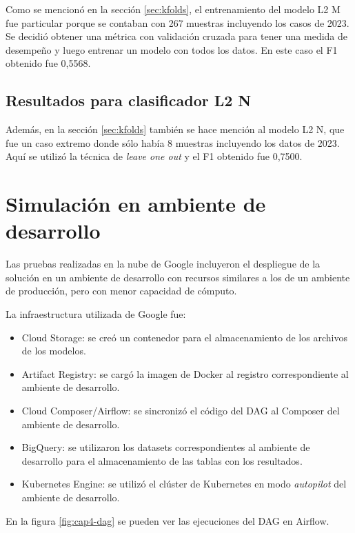 Como se mencionó en la sección \ref{sec:kfolds}, el entrenamiento del modelo L2 M fue particular porque se contaban con 267 muestras incluyendo los casos de 2023. Se decidió obtener una métrica con validación cruzada para tener una medida de desempeño y luego entrenar un modelo con todos los datos. En este caso el F1 obtenido fue 0,5568.

\subsection{Resultados para clasificador L2 N}

Además, en la sección \ref{sec:kfolds} también se hace mención al modelo L2 N, que fue un caso extremo donde sólo había 8 muestras incluyendo los datos de 2023. Aquí se utilizó la técnica de \textit{leave one out} y el F1 obtenido fue 0,7500.

\section{Simulación en ambiente de desarrollo}

Las pruebas realizadas en la nube de Google incluyeron el despliegue de la solución en un ambiente de desarrollo con recursos similares a los de un ambiente de producción, pero con menor capacidad de cómputo.

La infraestructura utilizada de Google fue:
\begin{itemize}
	\item Cloud Storage: se creó un contenedor para el almacenamiento de los archivos de los modelos.
	\item Artifact Registry: se cargó la imagen de Docker al registro correspondiente al ambiente de desarrollo.
	\item Cloud Composer/Airflow: se sincronizó el código del DAG al Composer del ambiente de desarrollo.
	\item BigQuery: se utilizaron los datasets correspondientes al ambiente de desarrollo para el almacenamiento de las tablas con los resultados.
	\item Kubernetes Engine: se utilizó el clúster de Kubernetes en modo \textit{autopilot} del ambiente de desarrollo.
\end{itemize}

En la figura \ref{fig:cap4-dag} se pueden ver las ejecuciones del DAG en Airflow.

